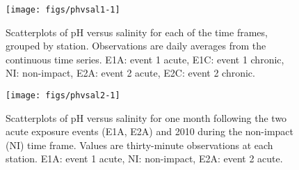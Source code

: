 \documentclass[letterpaper,12pt]{article}\usepackage[]{graphicx}\usepackage[]{color}
\makeatletter
\def\maxwidth{ %
  \ifdim\Gin@nat@width>\linewidth
    \linewidth
  \else
    \Gin@nat@width
  \fi
}
\makeatother
\begin{document}
\clearpage

\begin{figure}[!ht]

{\centering \texttt{[image: figs/phvsal1-1]} 

}

\caption[Scatterplots of pH versus salinity for each of the time frames, grouped by station]{Scatterplots of pH versus salinity for each of the time frames, grouped by station.  Observations are daily averages from the continuous time series. E1A: event 1 acute, E1C: event 1 chronic, NI: non-impact, E2A: event 2 acute, E2C: event 2 chronic.}\label{fig:phvsal1}
\end{figure}


\clearpage

\begin{figure}[!ht]

{\centering \texttt{[image: figs/phvsal2-1]} 

}

\caption[Scatterplots of pH versus salinity for one month following the two acute exposure events (E1A, E2A) and 2010 during the non-impact (NI) time frame]{Scatterplots of pH versus salinity for one month following the two acute exposure events (E1A, E2A) and 2010 during the non-impact (NI) time frame.  Values are thirty-minute observations at each station. E1A: event 1 acute, NI: non-impact, E2A: event 2 acute.}\label{fig:phvsal2}
\end{figure}


\clearpage
\end{document}

